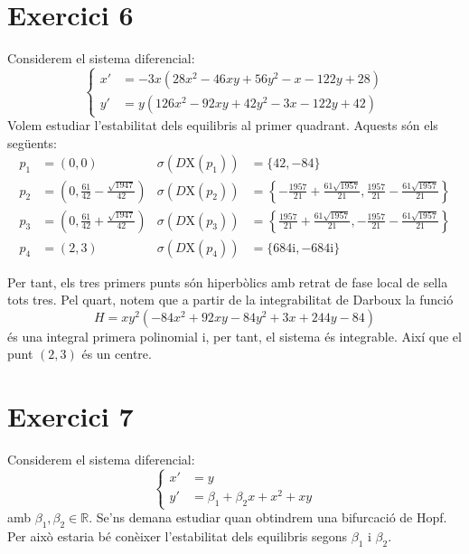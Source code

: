 \documentclass[a4paper]{article}
\newcommand{\RR}{\ensuremath{\mathbb{R}}} %
\newcommand{\vf}[1]{\boldsymbol{\mathrm{#1}}} %
\newcommand{\ii}{\mathrm{i}} %
\theoremstyle{definition}
\begin{document}
\cleardoublepage
\section*{Exercici 6}
Considerem el sistema diferencial:
\begin{equation}\label{sis6}
  \left\{
  \begin{aligned}
    x' & =-3x(28x^2-46xy+56y^2-x-122y+28) \\
    y' & =y(126x^2-92xy+42y^2-3x-122y+42)
  \end{aligned}
  \right.
\end{equation}
Volem estudiar l'estabilitat dels equilibris al primer quadrant. Aquests són els següents:
\begin{align*}
  p_1 & =(0,0)                                               & \sigma(D\vf{X}(p_1)) & =\{42, -84\}                                                                                        \\
  p_2 & =\left(0,\frac{61}{42}-\frac{\sqrt{1947}}{42}\right) & \sigma(D\vf{X}(p_2)) & =\left\{-\frac{1957}{21}+\frac{61\sqrt{1957}}{21}, \frac{1957}{21}-\frac{61\sqrt{1957}}{21}\right\} \\
  p_3 & =\left(0,\frac{61}{42}+\frac{\sqrt{1947}}{42}\right) & \sigma(D\vf{X}(p_3)) & =\left\{\frac{1957}{21}+\frac{61\sqrt{1957}}{21},-\frac{1957}{21}-\frac{61\sqrt{1957}}{21}\right\}  \\
  p_4 & =(2,3)                                               & \sigma(D\vf{X}(p_4)) & =\{684\ii, -684\ii\}
\end{align*}

Per tant, els tres primers punts són hiperbòlics amb retrat de fase local de sella tots tres. Pel quart, notem que a partir de la integrabilitat de Darboux la funció $$H = xy^2\left(-84x^2+92xy-84y^2+3x+244y-84\right)$$ és una integral primera polinomial i, per tant, el sistema és integrable. Així que el punt $(2, 3)$ és un centre.

\newpage
\section*{Exercici 7}
Considerem el sistema diferencial:
\begin{equation}\label{sis7}
  \left\{
  \begin{aligned}
    x' & =y                          \\
    y' & =\beta_1+\beta_2x + x^2 +xy
  \end{aligned}
  \right.
\end{equation}
amb $\beta_1,\beta_2\in\RR$. Se'ns demana estudiar quan obtindrem una bifurcació de Hopf. Per això estaria bé conèixer l'estabilitat dels equilibris segons $\beta_1$ i $\beta_2$.
\end{document}
